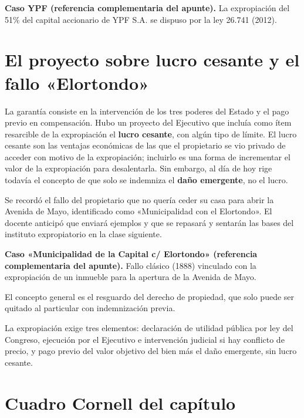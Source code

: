 \documentclass[12pt,oneside]{book}
\begin{document}
\begin{note}
\textbf{Caso YPF (referencia complementaria del apunte).} La expropiación del 51\% del capital accionario de YPF S.A. se dispuso por la ley 26.741 (2012).
\end{note}

\section{El proyecto sobre lucro cesante y el fallo «Elortondo»}

La garantía consiste en la intervención de los tres poderes del Estado y el pago previo en compensación. Hubo un proyecto del Ejecutivo que incluía como ítem resarcible de la expropiación el \textbf{lucro cesante}, con algún tipo de límite. El lucro cesante son las ventajas económicas de las que el propietario se vio privado de acceder con motivo de la expropiación; incluirlo es una forma de incrementar el valor de la expropiación para desalentarla. Sin embargo, al día de hoy rige todavía el concepto de que solo se indemniza el \textbf{daño emergente}, no el lucro.

Se recordó el fallo del propietario que no quería ceder su casa para abrir la Avenida de Mayo, identificado como «Municipalidad con el Elortondo». El docente anticipó que enviará ejemplos y que se repasará y sentarán las bases del instituto expropiatorio en la clase siguiente.

\begin{note}
\textbf{Caso «Municipalidad de la Capital c/ Elortondo» (referencia complementaria del apunte).} Fallo clásico (1888) vinculado con la expropiación de un inmueble para la apertura de la Avenida de Mayo.
\end{note}

El concepto general es el resguardo del derecho de propiedad, que solo puede ser quitado al particular con indemnización previa.

\begin{important}
La expropiación exige tres elementos: declaración de utilidad pública por ley del Congreso, ejecución por el Ejecutivo e intervención judicial si hay conflicto de precio, y pago previo del valor objetivo del bien más el daño emergente, sin lucro cesante.
\end{important}

\section{Cuadro Cornell del capítulo}
\end{document}
